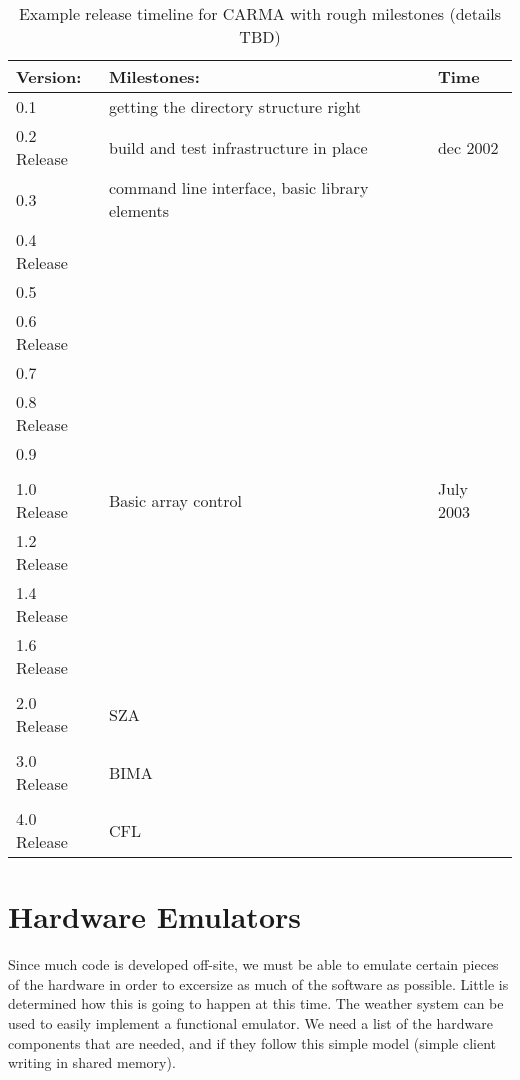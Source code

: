 \documentclass{article}
\begin{document}
\begin{table}[htbp]
\begin{tabular}{|l|l|l|}\hline\hline
Version:	   &   Milestones:					&	Time   \\
\hline
0.1		&	getting the directory structure right           &                \\
0.2 Release	&	build and test infrastructure in place		&	dec 2002 \\
0.3		&	command line interface, basic library elements  &               \\
0.4 Release     &                                                       & \\
0.5             & & \\
0.6 Release     & & \\
0.7             & & \\
0.8 Release     & & \\
0.9             & & \\
& & \\
\hline 
1.0 Release	&	Basic array control  &  July 2003\\
1.2 Release	&	 & \\
1.4 Release	&	 & \\
1.6 Release	&	 & \\
& & \\
\hline
2.0 Release	&	SZA & \\
& & \\
\hline
3.0 Release	&	BIMA  & \\
& & \\
\hline
4.0 Release	&	CFL  & \\
\hline
\end{tabular}
\caption{Example release timeline for CARMA with rough milestones (details TBD)}
\label{t:timeline}
\end{table}

\section{Hardware Emulators}

Since much code is developed off-site, we must be able to emulate certain
pieces of the hardware in order to excersize as much of the software as possible.
Little is determined how this is going to happen at this time. The weather system
can be used to easily implement a functional emulator. We need a list of 
the hardware components that are needed, and if they follow this simple model
(simple client writing in shared memory).
\end{document}
